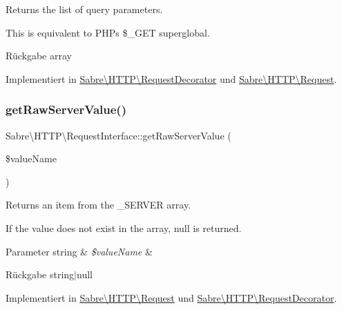 Returns the list of query parameters.

This is equivalent to P\+HP\textquotesingle{}s \$\+\_\+\+G\+ET superglobal.

\begin{DoxyReturn}{Rückgabe}
array 
\end{DoxyReturn}


Implementiert in \mbox{\hyperlink{class_sabre_1_1_h_t_t_p_1_1_request_decorator_a53b080a564c253e8eb531c6d3bc193c8}{Sabre\textbackslash{}\+H\+T\+T\+P\textbackslash{}\+Request\+Decorator}} und \mbox{\hyperlink{class_sabre_1_1_h_t_t_p_1_1_request_a2bf1d2de1af4871f761aa0f8a3b2d2cc}{Sabre\textbackslash{}\+H\+T\+T\+P\textbackslash{}\+Request}}.

\mbox{\label{interface_sabre_1_1_h_t_t_p_1_1_request_interface_a96c2cbeb9c1e9c3431c0f98bc7c7d93c}} 
\subsubsection{\texorpdfstring{get\+Raw\+Server\+Value()}{getRawServerValue()}}
{\footnotesize\ttfamily Sabre\textbackslash{}\+H\+T\+T\+P\textbackslash{}\+Request\+Interface\+::get\+Raw\+Server\+Value (\begin{DoxyParamCaption}\item[{}]{\$value\+Name }\end{DoxyParamCaption})}

Returns an item from the \+\_\+\+S\+E\+R\+V\+ER array.

If the value does not exist in the array, null is returned.


\begin{DoxyParams}[1]{Parameter}
string & {\em \$value\+Name} & \\
\hline
\end{DoxyParams}
\begin{DoxyReturn}{Rückgabe}
string$\vert$null 
\end{DoxyReturn}


Implementiert in \mbox{\hyperlink{class_sabre_1_1_h_t_t_p_1_1_request_abee040c0f5f18db19b5503c2c4f3379a}{Sabre\textbackslash{}\+H\+T\+T\+P\textbackslash{}\+Request}} und \mbox{\hyperlink{class_sabre_1_1_h_t_t_p_1_1_request_decorator_a9e7d4fb06d30561c0bcf256a897afdaf}{Sabre\textbackslash{}\+H\+T\+T\+P\textbackslash{}\+Request\+Decorator}}.

